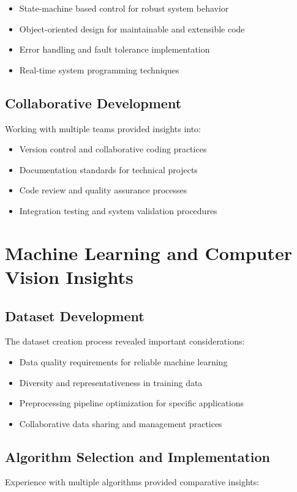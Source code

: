 \documentclass{book}
\begin{document}
\begin{itemize}
\item State-machine based control for robust system behavior
\item Object-oriented design for maintainable and extensible code
\item Error handling and fault tolerance implementation
\item Real-time system programming techniques
\end{itemize}

\subsection{Collaborative Development}
\par\noindent Working with multiple teams provided insights into:

\begin{itemize}
\item Version control and collaborative coding practices
\item Documentation standards for technical projects
\item Code review and quality assurance processes
\item Integration testing and system validation procedures
\end{itemize}

\section{Machine Learning and Computer Vision Insights}

\subsection{Dataset Development}
\par\noindent The dataset creation process revealed important considerations:

\begin{itemize}
\item Data quality requirements for reliable machine learning
\item Diversity and representativeness in training data
\item Preprocessing pipeline optimization for specific applications
\item Collaborative data sharing and management practices
\end{itemize}

\subsection{Algorithm Selection and Implementation}
\par\noindent Experience with multiple algorithms provided comparative insights:
\end{document}
